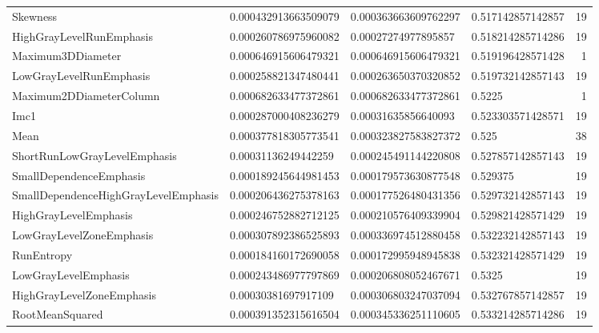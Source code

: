 {\begin{xltabular}[H]{\textwidth}{X l l l r}
    Skewness                               & \num{0.000432913663509079} & \num{0.000363663609762297} & \num{0.517142857142857} & 19\\
    HighGrayLevelRunEmphasis               & \num{0.000260786975960082} & \num{0.00027274977895857}  & \num{0.518214285714286} & 19\\
    Maximum3DDiameter                      & \num{0.000646915606479321} & \num{0.000646915606479321} & \num{0.519196428571428} & 1\\
    LowGrayLevelRunEmphasis                & \num{0.000258821347480441} & \num{0.000263650370320852} & \num{0.519732142857143} & 19\\
    Maximum2DDiameterColumn                & \num{0.000682633477372861} & \num{0.000682633477372861} & \num{0.5225} & 1\\
    Imc1                                   & \num{0.000287000408236279} & \num{0.00031635856640093}  & \num{0.523303571428571} & 19\\
    Mean                                   & \num{0.000377818305773541} & \num{0.000323827583827372} & \num{0.525} & 38\\
    ShortRunLowGrayLevelEmphasis           & \num{0.00031136249442259}  & \num{0.000245491144220808} & \num{0.527857142857143} & 19\\
    SmallDependenceEmphasis                & \num{0.000189245644981453} & \num{0.000179573630877548} & \num{0.529375} & 19\\
    SmallDependenceHighGrayLevelEmphasis   & \num{0.000206436275378163} & \num{0.000177526480431356} & \num{0.529732142857143} & 19\\
    HighGrayLevelEmphasis                  & \num{0.000246752882712125} & \num{0.000210576409339904} & \num{0.529821428571429} & 19\\
    LowGrayLevelZoneEmphasis               & \num{0.000307892386525893} & \num{0.000336974512880458} & \num{0.532232142857143} & 19\\
    RunEntropy                             & \num{0.000184160172690058} & \num{0.000172995948945838} & \num{0.532321428571429} & 19\\
    LowGrayLevelEmphasis                   & \num{0.000243486977797869} & \num{0.000206808052467671} & \num{0.5325} & 19\\
    HighGrayLevelZoneEmphasis              & \num{0.00030381697917109}  & \num{0.000306803247037094} & \num{0.532767857142857} & 19\\
    RootMeanSquared                        & \num{0.000391352315616504} & \num{0.000345336251110605} & \num{0.533214285714286} & 19\\

\end{xltabular}}
